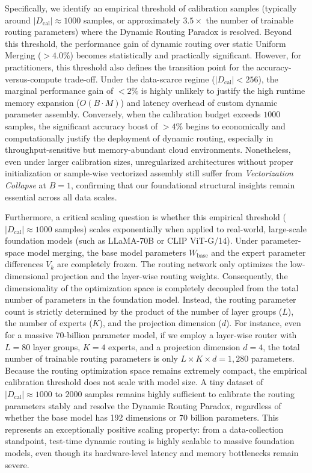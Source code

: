 Specifically, we identify an empirical threshold of calibration samples (typically around $|D_{\text{cal}}| \approx 1000$ samples, or approximately $3.5\times$ the number of trainable routing parameters) where the Dynamic Routing Paradox is resolved. Beyond this threshold, the performance gain of dynamic routing over static Uniform Merging ($>4.0\%$) becomes statistically and practically significant. However, for practitioners, this threshold also defines the transition point for the accuracy-versus-compute trade-off. Under the data-scarce regime ($|D_{\text{cal}}| < 256$), the marginal performance gain of $<2\%$ is highly unlikely to justify the high runtime memory expansion ($O(B \cdot M)$) and latency overhead of custom dynamic parameter assembly. Conversely, when the calibration budget exceeds $1000$ samples, the significant accuracy boost of $>4\%$ begins to economically and computationally justify the deployment of dynamic routing, especially in throughput-sensitive but memory-abundant cloud environments. Nonetheless, even under larger calibration sizes, unregularized architectures without proper initialization or sample-wise vectorized assembly still suffer from \emph{Vectorization Collapse} at $B=1$, confirming that our foundational structural insights remain essential across all data scales.

Furthermore, a critical scaling question is whether this empirical threshold ($|D_{\text{cal}}| \approx 1000$ samples) scales exponentially when applied to real-world, large-scale foundation models (such as LLaMA-70B or CLIP ViT-G/14). Under parameter-space model merging, the base model parameters $W_{\text{base}}$ and the expert parameter differences $V_k$ are completely frozen. The routing network only optimizes the low-dimensional projection and the layer-wise routing weights. Consequently, the dimensionality of the optimization space is completely decoupled from the total number of parameters in the foundation model. Instead, the routing parameter count is strictly determined by the product of the number of layer groups ($L$), the number of experts ($K$), and the projection dimension ($d$). For instance, even for a massive 70-billion parameter model, if we employ a layer-wise router with $L=80$ layer groups, $K=4$ experts, and a projection dimension $d=4$, the total number of trainable routing parameters is only $L \times K \times d = 1,280$ parameters. Because the routing optimization space remains extremely compact, the empirical calibration threshold does not scale with model size. A tiny dataset of $|D_{\text{cal}}| \approx 1000$ to $2000$ samples remains highly sufficient to calibrate the routing parameters stably and resolve the Dynamic Routing Paradox, regardless of whether the base model has 192 dimensions or 70 billion parameters. This represents an exceptionally positive scaling property: from a data-collection standpoint, test-time dynamic routing is highly scalable to massive foundation models, even though its hardware-level latency and memory bottlenecks remain severe.

